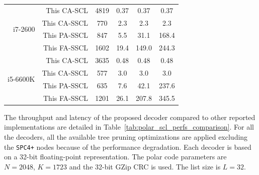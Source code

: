 \begin{table}
\begin{tabular}{r|r|c|c c c}
    \multirow{4}{*}{i7-2600}
    & This CA-SCL                    &  4819                             &  0.37           &   0.37          &   0.37          \\
    & This CA-SSCL                   &   770                             &  2.3            &   2.3           &   2.3           \\
    & This PA-SSCL                   &   847                             &  5.5            &  31.1           & 168.4           \\
    & This FA-SSCL                   &  1602                             & 19.4            & 149.0           & 244.3           \\
    \hline
    \multirow{4}{*}{i5-6600K}
    & This CA-SCL                    &  3635                             &  0.48           &   0.48          &   0.48          \\
    & This CA-SSCL                   &   577                             &  3.0            &   3.0           &   3.0           \\
    & This PA-SSCL                   &   635                             &  7.6            &  42.1           & 237.6           \\
    & This FA-SSCL                   &  1201                             & 26.1            & 207.8           & 345.5           \\
  \end{tabular}
\end{table}

The throughput and latency of the proposed decoder compared to other reported
implementations are detailed in Table~\ref{tab:polar_scl_perfs_comparison}. For
all the decoders, all the available tree pruning optimizations are applied
excluding the \texttt{SPC4+} nodes because of the performance degradation. Each
decoder is based on a 32-bit floating-point representation. The polar code
parameters are $N=2048$, $K=1723$ and the 32-bit GZip CRC is used. The list size
is $L=32$.

